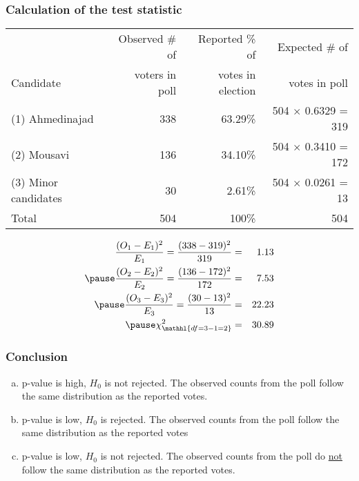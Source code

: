 \documentclass[slidestop,compress,mathserif]{beamer}
\begin{document}
\begin{frame}
\frametitle{Calculation of the test statistic}

{\small
\begin{center}
\begin{tabular}{l | r r r}
					& \footnotesize{Observed \# of} & \footnotesize{Reported \% of}	& \footnotesize{Expected \# of} \\
\footnotesize{Candidate}	& \footnotesize{voters in poll} & \footnotesize{votes in election}		&  \footnotesize{votes in poll} \\
\hline
\footnotesize{(1) Ahmedinajad}	& 338	& 63.29\% 	& 504 $\times$ 0.6329 = 319 \\
\footnotesize{(2) Mousavi}		& 136	& 34.10\%		& 504 $\times$ 0.3410 = 172 \\
\footnotesize{(3) Minor candidates}	& 30	& 2.61\% 		& 504 $\times$ 0.0261 = 13\\
\hline
Total			& 504	& 100\%		& 504
\end{tabular}
\end{center}
}

\pause

\begin{eqnarray*}
\frac{(O_1 - E_1)^2}{E_1} = \frac{(338 - 319)^2}{319} &=& 1.13 \\
\pause
\frac{(O_2 - E_2)^2}{E_2} = \frac{(136 - 172)^2}{172} &=& 7.53 \\
\pause
\frac{(O_3 - E_3)^2}{E_3} = \frac{(30 - 13)^2}{13} &=& 22.23 \\
\pause
 \chi^2_{\mathhl{df = 3 - 1 = 2}} &=& 30.89
\end{eqnarray*}


\end{frame}


\begin{frame}
\frametitle{Conclusion}


\begin{enumerate}[(a)]
\item p-value is high, $H_0$ is not rejected. The observed counts from the poll follow the same distribution as the reported votes.
\item p-value is low, $H_0$ is rejected. The observed counts from the poll follow the same distribution as the reported votes
\item p-value is low, $H_0$ is not rejected. The observed counts from the poll do \underline{not} follow the same distribution as the reported votes.
\end{enumerate}

\end{frame}


\end{document}
